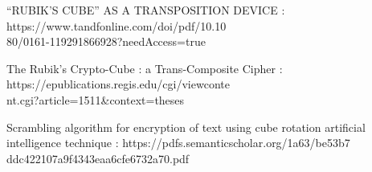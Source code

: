 \documentclass[titlepage]{jarticle}
\begin{document}
\begin{flushleft}
\begin{thebibliography}{}

 “RUBIK'S CUBE” AS A TRANSPOSITION DEVICE : https://www.tandfonline.com/doi/pdf/10.10\\80/0161-119291866928?needAccess=true

The Rubik's Crypto-Cube : a Trans-Composite Cipher : https://epublications.regis.edu/cgi/viewconte\\nt.cgi?article=1511\&context=theses

Scrambling algorithm for encryption of text using cube rotation artificial intelligence technique : https://pdfs.semanticscholar.org/1a63/be53b7\\ddc422107a9f4343eaa6cfe6732a70.pdf

\end{thebibliography}
\end{flushleft}
\end{document}
